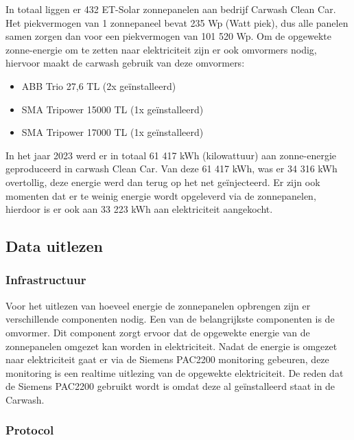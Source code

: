 In totaal liggen er 432 ET-Solar zonnepanelen aan bedrijf Carwash Clean Car. Het piekvermogen van 1 zonnepaneel bevat 235 Wp (Watt piek), dus alle panelen samen zorgen dan voor een piekvermogen van 101 520 Wp. Om de opgewekte zonne-energie om te zetten naar elektriciteit zijn er ook omvormers nodig, hiervoor maakt de carwash gebruik van deze omvormers:

\begin{itemize}
    \item ABB Trio 27,6 TL (2x geïnstalleerd)
    \item SMA Tripower 15000 TL (1x geïnstalleerd)
    \item SMA Tripower 17000 TL (1x geïnstalleerd)
\end{itemize}

In het jaar 2023 werd er in totaal 61 417 kWh (kilowattuur) aan zonne-energie geproduceerd in carwash Clean Car. Van deze 61 417 kWh, was er 34 316 kWh overtollig, deze energie werd dan terug op het net geïnjecteerd. Er zijn ook momenten dat er te weinig energie wordt opgeleverd via de zonnepanelen, hierdoor is er ook aan 33 223 kWh aan elektriciteit aangekocht.

\subsection{Data uitlezen}
\label{sec:stand-van-zaken-zonnepanelen-data-uitlezen}

\subsubsection{Infrastructuur}
\label{sec:stand-van-zaken-zonnepanelen-infrastructuur}

Voor het uitlezen van hoeveel energie de zonnepanelen opbrengen zijn er verschillende componenten nodig. Een van de belangrijkste componenten is de omvormer. Dit component zorgt ervoor dat de opgewekte energie van de zonnepanelen omgezet kan worden in elektriciteit. Nadat de energie is omgezet naar elektriciteit gaat er via de Siemens PAC2200 monitoring gebeuren, deze monitoring is een realtime uitlezing van de opgewekte elektriciteit. De reden dat de Siemens PAC2200 gebruikt wordt is omdat deze al geïnstalleerd staat in de Carwash.

\subsubsection{Protocol}
\label{sec:stand-van-zaken-zonnepanelen-protocol}

